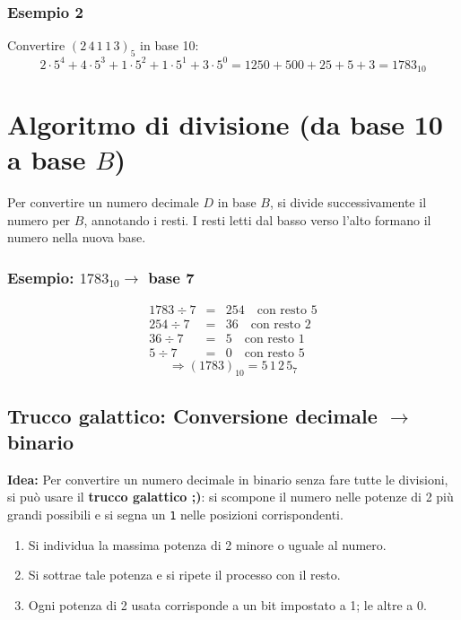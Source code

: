 \documentclass[a4paper,12pt]{report}
\begin{document}
\subsubsection*{Esempio 2}
Convertire \( (2\,4\,1\,1\,3)_5 \) in base 10:
\[
2 \cdot 5^4 + 4 \cdot 5^3 + 1 \cdot 5^2 + 1 \cdot 5^1 + 3 \cdot 5^0 = 1250 + 500 + 25 + 5 + 3 = \boxed{1783_{10}}
\]

\newpage
\section{Algoritmo di divisione (da base 10 a base \(B\))}

Per convertire un numero decimale \(D\) in base \(B\), si divide successivamente il numero per \(B\), annotando i resti.  
I resti letti dal basso verso l’alto formano il numero nella nuova base.

\subsubsection*{Esempio: \(1783_{10} \rightarrow \) base 7}
\[
\begin{array}{rcl}
1783 \div 7 &=& 254 \quad \text{con resto } \boxed{5} \\
254 \div 7 &=& 36 \quad \text{con resto } \boxed{2} \\
36 \div 7 &=& 5 \quad \text{con resto } \boxed{1} \\
5 \div 7 &=& 0 \quad \text{con resto } \boxed{5}
\end{array}
\]
\[
\Rightarrow (1783)_{10} = \boxed{5\,1\,2\,5}_7
\]

\subsection{Trucco galattico: Conversione decimale $\rightarrow$ binario}

\textbf{Idea:}  
Per convertire un numero decimale in binario senza fare tutte le divisioni, si può usare il \textbf{trucco galattico ;)}:  
si scompone il numero nelle potenze di 2 più grandi possibili e si segna un \texttt{1} nelle posizioni corrispondenti.

\begin{enumerate}
    \item Si individua la massima potenza di 2 minore o uguale al numero.
    \item Si sottrae tale potenza e si ripete il processo con il resto.
    \item Ogni potenza di 2 usata corrisponde a un bit impostato a 1; le altre a 0.
\end{enumerate}
\end{document}
